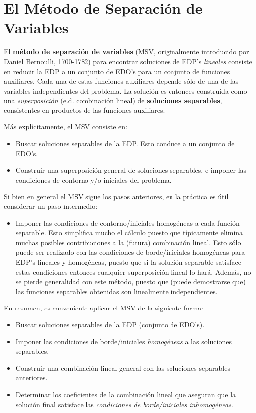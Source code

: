 \chapter{El Método de Separación de Variables}

El \textbf{método de separación de variables} (MSV, originalmente introducido por \href{https://es.wikipedia.org/wiki/Daniel_Bernoulli}{Daniel Bernoulli}, 1700-1782) para encontrar soluciones de EDP's \textit{lineales} consiste en reducir la EDP a un conjunto de EDO's para un conjunto de funciones auxiliares. Cada una de estas funciones auxiliares depende sólo de una de las variables independientes del problema. La solución es entonces construida como una \textit{superposición} (e.d. combinación lineal) de \textbf{soluciones separables}, consistentes en productos de las funciones auxiliares.

Más explícitamente, el MSV consiste en:
\begin{itemize}
    \item Buscar soluciones separables de la EDP. Esto conduce a un conjunto de EDO's.
    \item Construir una superposición general de soluciones separables, e imponer las condiciones de contorno y/o iniciales del problema.
\end{itemize}

Si bien en general el MSV sigue los pasos anteriores, en la práctica es útil considerar un paso intermedio:
\begin{itemize}
    \item Imponer las condiciones de contorno/iniciales homogéneas a cada función separable. Esto simplifica mucho el cálculo puesto que típicamente elimina muchas posibles contribuciones a la (futura) combinación lineal. Esto sólo puede ser realizado con las condiciones de borde/iniciales homogéneas para EDP's lineales y homogéneas, puesto que si la solución separable satisface estas condiciones entonces cualquier superposición lineal lo hará. Además, no se pierde generalidad con este método, puesto que (puede demostrarse que) las funciones separables obtenidas son linealmente independientes.
\end{itemize}

En resumen, es conveniente aplicar el MSV de la siguiente forma:
\begin{itemize}
    \item Buscar soluciones separables de la EDP (conjunto de EDO's).
    \item Imponer las condiciones de borde/iniciales \textit{homogéneas} a las soluciones separables.
    \item Construir una combinación lineal general con las soluciones separables anteriores.
    \item Determinar los coeficientes de la combinación lineal que aseguran que la solución final satisface las \textit{condiciones de borde/iniciales inhomogéneas}.
\end{itemize}



